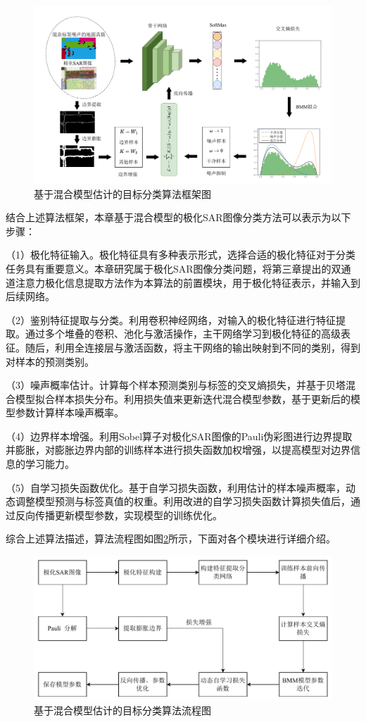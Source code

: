 \begin{figure}[ht!]
    \centering
    \includegraphics[width=14cm]{pic/chapter4/标签噪声鲁棒分类方法.pdf}
    \caption{基于混合模型估计的目标分类算法框架图}
    \label{BBM_framework}
\end{figure}

结合上述算法框架，本章基于混合模型的极化SAR图像分类方法可以表示为以下步骤：

（1）极化特征输入。极化特征具有多种表示形式，选择合适的极化特征对于分类任务具有重要意义。本章研究属于极化SAR图像分类问题，将第三章提出的双通道注意力极化信息提取方法作为本算法的前置模块，用于极化特征表示，并输入到后续网络。

（2）鉴别特征提取与分类。利用卷积神经网络，对输入的极化特征进行特征提取。通过多个堆叠的卷积、池化与激活操作，主干网络学习到极化特征的高级表征。随后，利用全连接层与激活函数，将主干网络的输出映射到不同的类别，得到对样本的预测类别。

（3）噪声概率估计。计算每个样本预测类别与标签的交叉熵损失，并基于贝塔混合模型拟合样本损失分布。利用损失值来更新迭代混合模型参数，基于更新后的模型参数计算样本噪声概率。

（4）边界样本增强。利用Sobel算子对极化SAR图像的Pauli伪彩图进行边界提取并膨胀，对膨胀边界内部的训练样本进行损失函数加权增强，以提高模型对边界信息的学习能力。

（5）自学习损失函数优化。基于自学习损失函数，利用估计的样本噪声概率，动态调整模型预测与标签真值的权重。利用改进的自学习损失函数计算损失值后，通过反向传播更新模型参数，实现模型的训练优化。

综合上述算法描述，算法流程图如图\ref{fig:流程图2}所示，下面对各个模块进行详细介绍。
\begin{figure}[ht!]
    \centering
    \includegraphics[width=14cm]{pic/chapter4/流程图.pdf}
    \caption{基于混合模型估计的目标分类算法流程图}
    \label{fig:流程图2}
\end{figure}

